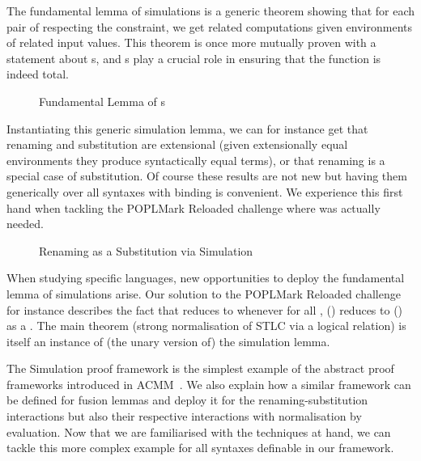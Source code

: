 The fundamental lemma of simulations is a generic theorem showing that for
each pair of \semrec{} respecting the  constraint, we
get related computations given environments of related input values. This
theorem is once more mutually proven with a statement about s,
and s play a crucial role in ensuring that the function is indeed total.

\begin{figure}[h]
\caption{Fundamental Lemma of s}
\end{figure}

Instantiating this generic simulation lemma, we can for instance get
that renaming and substitution are extensional (given extensionally
equal environments they produce syntactically equal terms), or that
renaming is a special case of substitution. Of course these results
are not new but having them generically over all syntaxes with binding
is convenient. We experience this first hand when tackling the
POPLMark Reloaded challenge where  was actually needed.

\begin{figure}[h]
\caption{Renaming as a Substitution via Simulation}
\end{figure}

When studying specific languages, new opportunities to deploy the
fundamental lemma of simulations arise. Our solution to the POPLMark
Reloaded challenge for instance describes the fact that { \AB{$\rho$} }
reduces to {  } whenever for all ,
\AB{$\rho$}() reduces to () as a .
The main theorem (strong normalisation of STLC via a logical relation)
is itself an instance of (the unary version of) the simulation lemma.

The Simulation proof framework is the simplest example of the abstract
proof frameworks introduced in ACMM~\citeyear{allais2017type}. We also
explain how a similar framework can be defined
for fusion lemmas and deploy it for the renaming-substitution interactions
but also their respective interactions with normalisation by evaluation.
Now that we are familiarised with the techniques at hand, we can tackle
this more complex example for all syntaxes definable in our framework.



